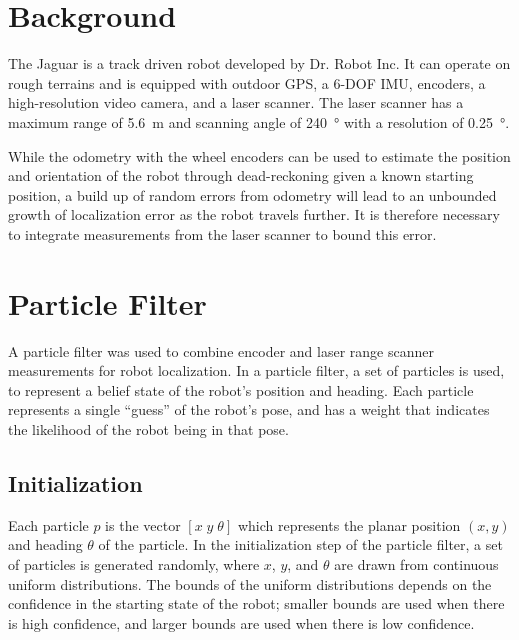 \documentclass[conference]{../IEEEtran}
\begin{document}
\section{Background}
The Jaguar is a track driven robot developed by Dr. Robot Inc. It can operate on rough
terrains and is equipped with outdoor GPS, a 6-DOF IMU, encoders, a high-resolution video
camera, and a laser scanner.  The laser scanner has a maximum range of \SI{5.6}{\meter}
and scanning angle of \SI{240}{\degree} with a resolution of \SI{0.25}{\degree}.

While the odometry with the wheel encoders can be used to estimate the position and
orientation of the robot through dead-reckoning given a known starting position, a build
up of random errors from odometry will lead to an unbounded growth of localization error
as the robot travels further.  It is therefore necessary to integrate measurements from
the laser scanner to bound this error.

\section{Particle Filter}
A particle filter was used to combine encoder and laser range scanner measurements for
robot localization. In a particle filter, a set of particles is used, to represent a
belief state of the robot's position and heading. Each particle represents a single
``guess'' of the robot's pose, and has a weight that indicates the likelihood of the robot
being in that pose.

\subsection{Initialization}

Each particle $p$ is the vector $[x\; y\; \theta]$ which represents the planar position
$(x,y)$ and heading $\theta$ of the particle. In the initialization step of the particle
filter, a set of particles is generated randomly, where $x$, $y$, and $\theta$ are drawn
from continuous uniform distributions.  The bounds of the uniform distributions depends on
the confidence in the starting state of the  robot; smaller bounds are used when there is
high confidence, and larger bounds are used when there is low confidence.
\end{document}
